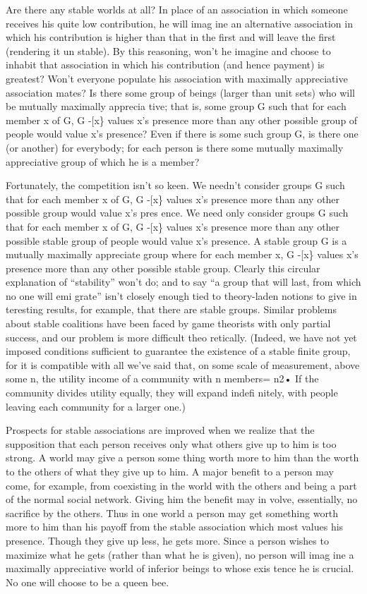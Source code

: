 \documentclass[11pt,openany]{book}
\begin{document}
Are there any stable worlds at all? In place of an association in which someone receives his quite low contribution, he will imag ine an alternative association in which his contribution is higher than that in the first and will leave the first (rendering it un stable). By this reasoning, won't he imagine and choose to inhabit that association in which his contribution (and hence payment) is greatest? Won't everyone populate his association with maximally appreciative association mates? Is there some group of beings (larger than unit sets) who will be mutually maximally apprecia tive; that is, some group G such that for each member x of G, G -[x\} values x's presence more than any other possible group of people would value x's presence? Even if there is some such group G, is there one (or another) for everybody; for each person is there some mutually maximally appreciative group of which he is a member? 

Fortunately, the competition isn't so keen. We needn't consider groups G such that for each member x of G, G -[x\} values x's presence more than any other possible group would value x's pres ence. We need only consider groups G such that for each member x of G, G -[x\} values x's presence more than any other possible stable group of people would value x's presence. A stable group G is a mutually maximally appreciate group where for each member x, G -[x\} values x's presence more than any other possible stable group. Clearly this circular explanation of ``stability'' won't do; and to say ``a group that will last, from which no one will emi grate'' isn't closely enough tied to theory-laden notions to give in teresting results, for example, that there are stable groups. Similar problems about stable coalitions have been faced by game theorists with only partial success, and our problem is more difficult theo retically. (Indeed, we have not yet imposed conditions sufficient to guarantee the existence of a stable finite group, for it is compatible with all we've said that, on some scale of measurement, above some n, the utility income of a community with n members= n2• If the community divides utility equally, they will expand indefi nitely, with people leaving each community for a larger one.) 

Prospects for stable associations are improved when we realize that the supposition that each person receives only what others give up to him is too strong. A world may give a person some thing worth more to him than the worth to the others of what they give up to him. A major benefit to a person may come, for example, from coexisting in the world with the others and being a part of the normal social network. Giving him the benefit may in volve, essentially, no sacrifice by the others. Thus in one world a person may get something worth more to him than his payoff from the stable association which most values his presence. Though they give up less, he gets more. Since a person wishes to maximize what he gets (rather than what he is given), no person will imag ine a maximally appreciative world of inferior beings to whose exis tence he is crucial. No one will choose to be a queen bee. 
\end{document}
